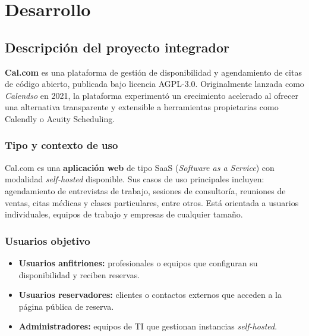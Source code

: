 \documentclass[12pt, a4paper]{article}
\begin{document}
\newpage

\section{Desarrollo}

\subsection{Descripción del proyecto integrador}

\textbf{Cal.com} es una plataforma de gestión de disponibilidad y agendamiento de citas
de código abierto, publicada bajo licencia AGPL-3.0. Originalmente lanzada como
\textit{Calendso} en 2021, la plataforma experimentó un crecimiento acelerado al ofrecer
una alternativa transparente y extensible a herramientas propietarias como Calendly o
Acuity Scheduling.

\subsubsection*{Tipo y contexto de uso}

Cal.com es una \textbf{aplicación web} de tipo SaaS (\textit{Software as a Service})
con modalidad \textit{self-hosted} disponible. Sus casos de uso principales incluyen:
agendamiento de entrevistas de trabajo, sesiones de consultoría, reuniones de ventas,
citas médicas y clases particulares, entre otros. Está orientada a usuarios individuales,
equipos de trabajo y empresas de cualquier tamaño.

\subsubsection*{Usuarios objetivo}

\begin{itemize}
    \item \textbf{Usuarios anfitriones:} profesionales o equipos que configuran su disponibilidad y reciben reservas.
    \item \textbf{Usuarios reservadores:} clientes o contactos externos que acceden a la página pública de reserva.
    \item \textbf{Administradores:} equipos de TI que gestionan instancias \textit{self-hosted}.
\end{itemize}
\end{document}
